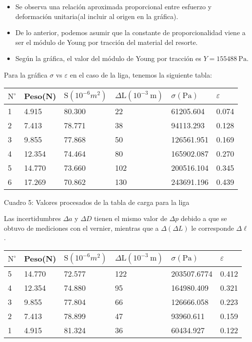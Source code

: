 \begin{itemize}
  \item Se observa una relación aproximada proporcional entre esfuerzo y deformación unitaria(al incluir al origen en la gráfica).
  \item De lo anterior, podemos asumir que la constante de proporcionalidad viene a ser el módulo de Young por tracción del material del resorte.
  \item Según la gráfica, el valor del módulo de Young por tracción es $Y=155488 \mathrm{~Pa}$.
\end{itemize}

Para la gráfica $\sigma$ vs $\varepsilon$ en el caso de la liga, tenemos la siguiente tabla:

\begin{center}
\begin{tabular}{|l|l|l|l|l|l|}
\hline
$\mathrm{N}^{\circ}$ & Peso(N) & $\mathrm{S}\left(10^{-6} m^{2}\right)$ & $\Delta \mathrm{L}\left(10^{-3} \mathrm{~m}\right)$ & $\sigma(\mathrm{Pa})$ & $\varepsilon$ \\
\hline
1 & 4.915 & 80.300 & 22 & 61205.604 & 0.074 \\
\hline
2 & 7.413 & 78.771 & 38 & 94113.293 & 0.128 \\
\hline
3 & 9.855 & 77.868 & 50 & 126561.951 & 0.169 \\
\hline
4 & 12.354 & 74.464 & 80 & 165902.087 & 0.270 \\
\hline
5 & 14.770 & 73.660 & 102 & 200516.104 & 0.345 \\
\hline
6 & 17.269 & 70.862 & 130 & 243691.196 & 0.439 \\
\hline
\end{tabular}
\end{center}

Cuadro 5: Valores procesados de la tabla de carga para la liga

Las incertidumbres $\Delta a$ y $\Delta D$ tienen el mismo valor de $\Delta p$ debido a que se obtuvo de mediciones con el vernier, mientras que a $\Delta(\Delta L)$ le corresponde $\Delta \ell$.

\begin{center}
\begin{tabular}{|l|l|l|l|l|l|}
\hline
$\mathrm{N}^{\circ}$ & Peso(N) & $\mathrm{S}\left(10^{-6} m^{2}\right)$ & $\Delta \mathrm{L}\left(10^{-3} \mathrm{~m}\right)$ & $\sigma(\mathrm{Pa})$ & $\varepsilon$ \\
\hline
5 & 14.770 & 72.577 & 122 & 203507.6774 & 0.412 \\
\hline
4 & 12.354 & 74.880 & 95 & 164980.409 & 0.321 \\
\hline
3 & 9.855 & 77.804 & 66 & 126666.058 & 0.223 \\
\hline
2 & 7.413 & 78.899 & 47 & 93960.611 & 0.159 \\
\hline
1 & 4.915 & 81.324 & 36 & 60434.927 & 0.122 \\
\hline
\end{tabular}
\end{center}

